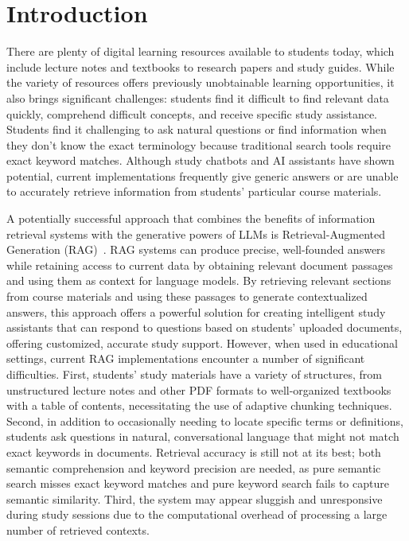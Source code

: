 \documentclass[runningheads]{llncs}
\begin{document}
\section{Introduction}
There are plenty of digital learning resources available to students today, which include lecture notes and textbooks to research papers and study guides. While the variety of resources offers previously unobtainable learning opportunities, it also brings significant challenges: students find it difficult to find relevant data quickly, comprehend difficult concepts, and receive specific study assistance. Students find it challenging to ask natural questions or find information when they don't know the exact terminology because traditional search tools require exact keyword matches. Although study chatbots and AI assistants have shown potential, current implementations frequently give generic answers or are unable to accurately retrieve information from students' particular course materials.

A potentially successful approach that combines the benefits of information retrieval systems with the generative powers of LLMs is Retrieval-Augmented Generation (RAG)~\cite{lewis2020retrieval}. RAG systems can produce precise, well-founded answers while retaining access to current data by obtaining relevant document passages and using them as context for language models. By retrieving relevant sections from course materials and using these passages to generate contextualized answers, this approach offers a powerful solution for creating intelligent study assistants that can respond to questions based on students' uploaded documents, offering customized, accurate study support. However, when used in educational settings, current RAG implementations encounter a number of significant difficulties. First, students' study materials have a variety of structures, from unstructured lecture notes and other PDF formats to well-organized textbooks with a table of contents, necessitating the use of adaptive chunking techniques. Second, in addition to occasionally needing to locate specific terms or definitions, students ask questions in natural, conversational language that might not match exact keywords in documents. Retrieval accuracy is still not at its best; both semantic comprehension and keyword precision are needed, as pure semantic search misses exact keyword matches and pure keyword search fails to capture semantic similarity. Third, the system may appear sluggish and unresponsive during study sessions due to the computational overhead of processing a large number of retrieved contexts.
\end{document}
